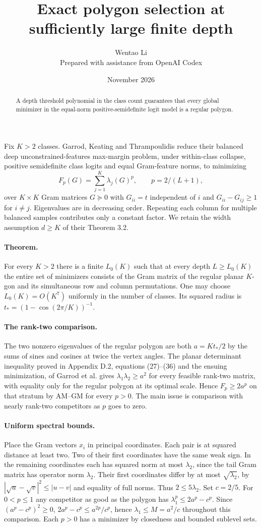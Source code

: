 \documentclass[10pt]{article}
\title{Exact polygon selection at sufficiently large finite depth}
\author{Wentao Li\\{\small Prepared with assistance from OpenAI Codex}}
\date{November 2026}
\begin{document}
\maketitle
\begin{abstract}
A depth threshold polynomial in the class count guarantees that every global minimizer in the equal-norm positive-semidefinite logit model is a regular polygon.
\end{abstract}
Fix $K>2$ classes. Garrod, Keating and Thrampoulidis reduce their balanced deep unconstrained-features max-margin problem, under within-class collapse, positive semidefinite class logits and equal Gram-feature norms, to minimizing
\[
 F_p(G)=\sum_{j=1}^K\lambda_j(G)^p,\qquad p=2/(L+1),
\]
over $K\times K$ Gram matrices $G\succeq0$ with $G_{ii}=t$ independent of $i$ and $G_{ii}-G_{ij}\ge1$ for $i\ne j$. Eigenvalues are in decreasing order. Repeating each column for multiple balanced samples contributes only a constant factor. We retain the width assumption $d\ge K$ of their Theorem 3.2.

\paragraph{Theorem.} For every $K>2$ there is a finite $L_0(K)$ such that at every depth $L\ge L_0(K)$ the entire set of minimizers consists of the Gram matrix of the regular planar $K$-gon and its simultaneous row and column permutations. One may choose $L_0(K)=O(K^7)$ uniformly in the number of classes. Its squared radius is $t_*=(1-\cos(2\pi/K))^{-1}$.

\paragraph{The rank-two comparison.} The two nonzero eigenvalues of the regular polygon are both $a=Kt_*/2$ by the sums of sines and cosines at twice the vertex angles. The planar determinant inequality proved in Appendix D.2, equations (27)--(36) and the ensuing minimization, of Garrod et al. gives $\lambda_1\lambda_2\ge a^2$ for every feasible rank-two matrix, with equality only for the regular polygon at its optimal scale. Hence $F_p\ge2a^p$ on that stratum by AM--GM for every $p>0$. The main issue is comparison with nearly rank-two competitors as $p$ goes to zero.

\paragraph{Uniform spectral bounds.} Place the Gram vectors $x_i$ in principal coordinates. Each pair is at squared distance at least two. Two of their first coordinates have the same weak sign. In the remaining coordinates each has squared norm at most $\lambda_2$, since the tail Gram matrix has operator norm $\lambda_2$. Their first coordinates differ by at most $\sqrt{\lambda_2}$, by $|\sqrt u-\sqrt v|^2\le |u-v|$ and equality of full norms. Thus $2\le5\lambda_2$. Set $c=2/5$. For $0<p\le1$ any competitor as good as the polygon has $\lambda_1^p\le2a^p-c^p$. Since $(a^p-c^p)^2\ge0$, $2a^p-c^p\le a^{2p}/c^p$, hence $\lambda_1\le M=a^2/c$ throughout this comparison. Each $p>0$ has a minimizer by closedness and bounded sublevel sets.
\end{document}
